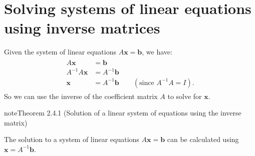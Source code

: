 \documentclass[letterpaper,10pt,english]{jupyterBook}
\begin{document}
\section{Solving systems of linear equations using inverse matrices}
\label{\detokenize{_pages/2.1_Solving_using_inverse_matrix:solving-systems-of-linear-equations-using-inverse-matrices}}\label{\detokenize{_pages/2.1_Solving_using_inverse_matrix:index-0}}\label{\detokenize{_pages/2.1_Solving_using_inverse_matrix:solving-systems-using-inverse-section}}\label{\detokenize{_pages/2.1_Solving_using_inverse_matrix::doc}}
\sphinxAtStartPar
Given the system of linear equations \(A \mathbf{x} = \mathbf{b}\), we have:
\begin{equation*}
\begin{split} \begin{align*}
    A\mathbf{x} &= \mathbf{b}\\
    A^{-1}A \mathbf{x} &= A^{-1}\mathbf{b}\\
    \mathbf{x} &= A^{-1}\mathbf{b} \qquad (\text{since } A^{-1}A = I).
\end{align*} \end{split}
\end{equation*}
\sphinxAtStartPar
So we can use the inverse of the coefficient matrix \(A\) to solve for \(\mathbf{x}\).
\label{_pages/2.1_Solving_using_inverse_matrix:solution-using-inverse-matrix-theorem}
\begin{sphinxadmonition}{note}{Theorem 2.4.1 (Solution of a linear system of equations using the inverse matrix)}



\sphinxAtStartPar
The solution to a system of linear equations \(A\mathbf{x} = \mathbf{b}\) can be calculated using \(\mathbf{x} = A^{-1}\mathbf{b}\).
\end{sphinxadmonition}
\end{document}
